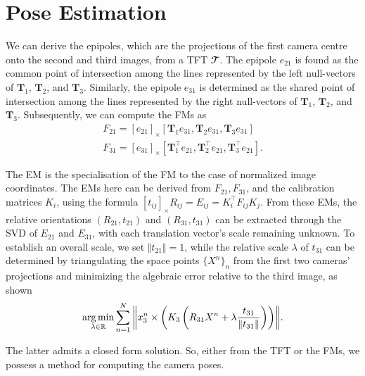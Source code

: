 \section{Pose Estimation}\label{sec:estimation}
We can derive the epipoles, which are the projections of the first camera centre onto the second and third images, from a \acs{TFT} \( \mathbfcal{T} \). The epipole \( e_{21} \) is found as the common point of intersection among the lines represented by the left null-vectors of \( \bm{T}_1 \), \( \bm{T}_2 \), and \( \bm{T}_3 \). Similarly, the epipole \( e_{31} \) is determined as the shared point of intersection among the lines represented by the right null-vectors of \( \bm{T}_1 \), \( \bm{T}_2 \), and \( \bm{T}_3 \). Subsequently, we can compute the \acs{FM}s as
\begin{equation}
	\begin{gathered}
		F_{21} = [e_{21}]_{\times}[\bm{T}_1e_{31}, \bm{T}_2e_{31}, \bm{T}_3e_{31}]\\
		F_{31} = [e_{31}]_{\times}[\bm{T}_1^\top e_{21}, \bm{T}_2^\top e_{21}, \bm{T}_3^\top e_{21}].
	\end{gathered}
	\label{eq:fmFromEpiTFT}
\end{equation}

The \ac{EM} is the specialisation of the \acs{FM} to the case of normalized image coordinates. The \acs{EM}s here can be derived from \( F_{21}, F_{31} \), and the calibration matrices \( K_i \), using the formula \( [t_{ij}]_{\times}R_{ij} = E_{ij} = K_i^\top F_{ij}K_j \). From these \acs{EM}s, the relative orientations \( (R_{21}, t_{21}) \) and \( (R_{31}, t_{31}) \) can be extracted through the \acs{SVD} of \( E_{21} \) and \( E_{31} \), with each translation vector's scale remaining unknown. To establish an overall scale, we set \( \Vert t_{21} \Vert = 1 \), while the relative scale \( \lambda \) of \( t_{31} \) can be determined by triangulating the space points \( \{X^n\}_n \) from the first two cameras' projections and minimizing the algebraic error relative to the third image, as shown
\begin{equation}
	\operatorname*{arg\,min}_{\lambda \in \mathbb{R}}{\sum_{n = 1}^{N}{\left\Vert x_3^n \times \left( K_3 \left( R_{31}X^n + \lambda \frac{t_{31}}{\Vert t_{31} \Vert} \right) \right) \right\Vert}}.
\end{equation}

The latter admits a closed form solution. So, either from the \acs{TFT} or the \acs{FM}s, we possess a method for computing the camera poses.

